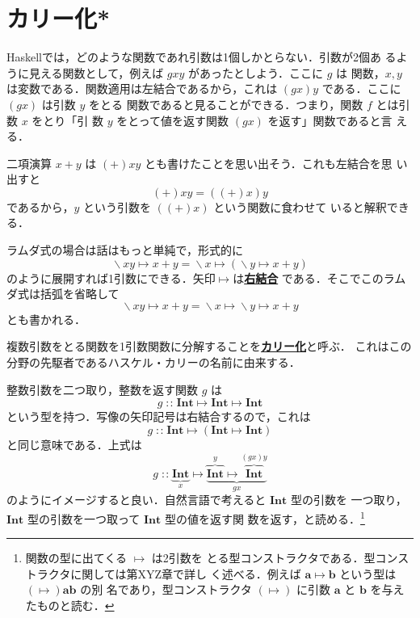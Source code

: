 \documentclass[a5paper,twoside,fleqn,draft]{jsbook}
\newcommand{\programminglanguage}[1]{\textsf{#1}}
\newcommand{\haskell}{\programminglanguage{Haskell}}
\newcommand{\keyword}[1]{{\underline{\textbf{#1}}}}
\DeclareMathOperator{\mFuncArrow}{\mapsto}
\DeclareMathOperator{\mIn}{{:\!:}}
\DeclareMathOperator{\mLambda}{\backslash}
\DeclareMathOperator{\mLambdaArrow}{\mapsto}
\newcommand{\mType}[1]{\mathbf{#1}} %
\newcommand{\mA}{\mType{a}}
\newcommand{\mB}{\mType{b}}
\newcommand{\mIntType}{\mType{Int}}
\begin{document}
\section{カリー化*}

\haskell では，どのような関数であれ引数は1個しかとらない．引数が2個あ
るように見える関数として，例えば $gxy$ があったとしよう．ここに $g$ は
関数，$x,y$ は変数である．関数適用は左結合であるから，これは
$\left(gx\right)y$ である．ここに $\left(gx\right)$ は引数 $y$ をとる
関数であると見ることができる．つまり，関数 $f$ とは引数 $x$ をとり「引
  数 $y$ をとって値を返す関数 $\left(gx\right)$ を返す」関数であると言
える．

二項演算 $x+y$ は $(+)xy$ とも書けたことを思い出そう．これも左結合を思
い出すと
\begin{equation}
  (+)xy
  =\left((+)x\right)y
\end{equation}
であるから，$y$ という引数を $\left((+)x\right)$ という関数に食わせて
いると解釈できる．

ラムダ式の場合は話はもっと単純で，形式的に
\begin{equation}
  \mLambda xy\mLambdaArrow x+y
  =\mLambda x\mLambdaArrow\left(\mLambda y\mLambdaArrow x+y\right)
\end{equation}
のように展開すれば1引数にできる．矢印$\mLambdaArrow$は\keyword{右結合}
である．そこでこのラムダ式は括弧を省略して
\begin{equation}
  \mLambda xy\mLambdaArrow x+y
  =\mLambda x\mLambdaArrow\mLambda y\mLambdaArrow x+y
\end{equation}
とも書かれる．

複数引数をとる関数を1引数関数に分解することを\keyword{カリー化}と呼ぶ．
これはこの分野の先駆者であるハスケル・カリーの名前に由来する．


整数引数を二つ取り，整数を返す関数 $g$ は
\begin{equation}
  g
  \mIn\mIntType\mFuncArrow\mIntType\mFuncArrow\mIntType
\end{equation}
という型を持つ．写像の矢印記号は右結合するので，これは
\begin{equation}
  g
  \mIn\mIntType\mFuncArrow(\mIntType\mFuncArrow\mIntType)
\end{equation}
と同じ意味である．上式は
\begin{equation*}
  g
  \mIn\underbrace{\mIntType}_x
  \mFuncArrow\underbrace{\overbrace{\mIntType}^y\mFuncArrow\overbrace{\mIntType}^{(gx)y}}_{gx}
\end{equation*}
のようにイメージすると良い．自然言語で考えると $\mIntType$ 型の引数を
一つ取り，$\mIntType$ 型の引数を一つ取って $\mIntType$ 型の値を返す関
数を返す，と読める．\footnote{関数の型に出てくる $\mFuncArrow$ は2引数を
  とる型コンストラクタである．型コンストラクタに関しては第XYZ章で詳し
  く述べる．例えば $\mA\mFuncArrow\mB$ という型は $(\mFuncArrow)\mA\mB$ の別
  名であり，型コンストラクタ $(\mFuncArrow)$ に引数 $\mA$ と $\mB$ を与え
  たものと読む．}
\end{document}
